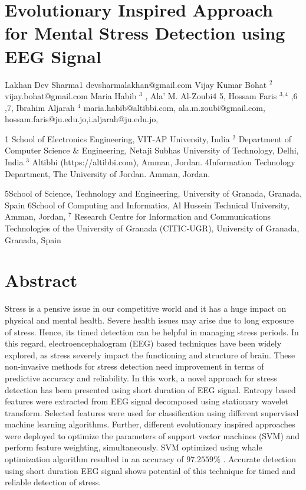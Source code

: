 \section{Evolutionary Inspired Approach for Mental Stress Detection using EEG Signal}

Lakhan Dev Sharma1 devsharmalakhan@gmail.com Vijay Kumar Bohat $^2$ vijay.bohat@gmail.com Maria Habib $^3$ , Ala’ M. Al-Zoubi4 5, Hossam Faris $^{3,4}$ ,6 ,7, Ibrahim Aljarah $^4$ maria.habib@altibbi.com, ala.m.zoubi@gmail.com, hossam.faris@ju.edu.jo,i.aljarah@ju.edu.jo,

1 School of Electronics Engineering, VIT-AP University, India $^2$ Department of Computer Science \& Engineering, Netaji Subhas University of Technology, Delhi, India $^{3}$ Altibbi (https://altibbi.com), Amman, Jordan. 4Information Technology Department, The University of Jordan. Amman, Jordan.

5School of Science, Technology and Engineering, University of Granada, Granada, Spain 6School of Computing and Informatics, Al Hussein Technical University, Amman, Jordan, $^7$ Research Centre for Information and Communications Technologies of the University of Granada (CITIC-UGR), University of Granada, Granada, Spain

\section{Abstract}

Stress is a pensive issue in our competitive world and it has a huge impact on physical and mental health. Severe health issues may arise due to long exposure of stress. Hence, its timed detection can be helpful in managing stress periods. In this regard, electroencephalogram (EEG) based techniques have been widely explored, as stress severely impact the functioning and structure of brain. These non-invasive methods for stress detection need improvement in terms of predictive accuracy and reliability. In this work, a novel approach for stress detection has been presented using short duration of EEG signal. Entropy based features were extracted from EEG signal decomposed using stationary wavelet transform. Selected features were used for classification using different supervised machine learning algorithms. Further, different evolutionary inspired approaches were deployed to optimize the parameters of support vector machines (SVM) and perform feature weighting, simultaneously. SVM optimized using whale optimization algorithm resulted in an accuracy of $97.2559\%$ . Accurate detection using short duration EEG signal shows potential of this technique for timed and reliable detection of stress.

